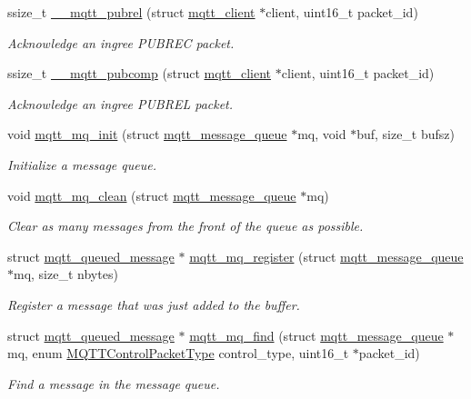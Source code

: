 \begin{DoxyCompactItemize}
ssize\+\_\+t \hyperlink{group__details_ga427f9191ab9967b75e0a7a2f7fa0dca0}{\+\_\+\+\_\+mqtt\+\_\+pubrel} (struct \hyperlink{structmqtt__client}{mqtt\+\_\+client} $\ast$client, uint16\+\_\+t packet\+\_\+id)
\begin{DoxyCompactList}\small\item\em Acknowledge an ingree P\+U\+B\+R\+EC packet. \end{DoxyCompactList}\item 
ssize\+\_\+t \hyperlink{group__details_ga86ddd2a08fbe4bd351dfd161db93303d}{\+\_\+\+\_\+mqtt\+\_\+pubcomp} (struct \hyperlink{structmqtt__client}{mqtt\+\_\+client} $\ast$client, uint16\+\_\+t packet\+\_\+id)
\begin{DoxyCompactList}\small\item\em Acknowledge an ingree P\+U\+B\+R\+EL packet. \end{DoxyCompactList}\item 
void \hyperlink{group__details_ga0da861c969387bf8d0229924543d9bb7}{mqtt\+\_\+mq\+\_\+init} (struct \hyperlink{structmqtt__message__queue}{mqtt\+\_\+message\+\_\+queue} $\ast$mq, void $\ast$buf, size\+\_\+t bufsz)
\begin{DoxyCompactList}\small\item\em Initialize a message queue. \end{DoxyCompactList}\item 
void \hyperlink{group__details_gadb54c413b4d884619c50cc20ee6eb084}{mqtt\+\_\+mq\+\_\+clean} (struct \hyperlink{structmqtt__message__queue}{mqtt\+\_\+message\+\_\+queue} $\ast$mq)
\begin{DoxyCompactList}\small\item\em Clear as many messages from the front of the queue as possible. \end{DoxyCompactList}\item 
struct \hyperlink{structmqtt__queued__message}{mqtt\+\_\+queued\+\_\+message} $\ast$ \hyperlink{group__details_gaa34e6af3ab1af60ebf8fe7b86be868fc}{mqtt\+\_\+mq\+\_\+register} (struct \hyperlink{structmqtt__message__queue}{mqtt\+\_\+message\+\_\+queue} $\ast$mq, size\+\_\+t nbytes)
\begin{DoxyCompactList}\small\item\em Register a message that was just added to the buffer. \end{DoxyCompactList}\item 
struct \hyperlink{structmqtt__queued__message}{mqtt\+\_\+queued\+\_\+message} $\ast$ \hyperlink{group__details_ga1ffcd45af057865a0d85b4e9e24789a2}{mqtt\+\_\+mq\+\_\+find} (struct \hyperlink{structmqtt__message__queue}{mqtt\+\_\+message\+\_\+queue} $\ast$mq, enum \hyperlink{group__unpackers_gacbd36b88ec7f62bc161b07e1a0aed679}{M\+Q\+T\+T\+Control\+Packet\+Type} control\+\_\+type, uint16\+\_\+t $\ast$packet\+\_\+id)
\begin{DoxyCompactList}\small\item\em Find a message in the message queue. \end{DoxyCompactList}\end{DoxyCompactItemize}


